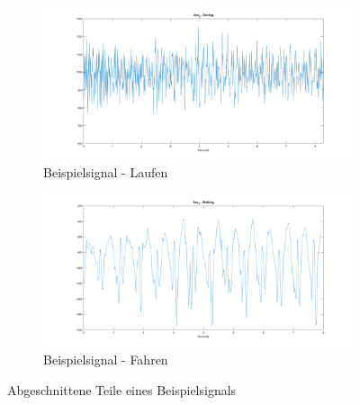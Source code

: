\begin{figure}[H]
	\centering
	\begin{subfigure}{\textwidth}
		\centering
		\includegraphics[width=\textwidth]{Bilder/AccZ_Driving_8Sec.png}
		\caption{Beispielsignal - Laufen}
		\label{fig:AccZ_Driving_8Sec}
	\end{subfigure}
	\hfill
	\begin{subfigure}{\textwidth}
		\centering
		\includegraphics[width=\textwidth]{Bilder/AccZ_Walking_8Sec.png}
		\caption{Beispielsignal - Fahren}
		\label{fig:AccZ_Walking_8Sec}
	\end{subfigure}
	\caption{Abgeschnittene Teile eines Beispielsignals}
	\label{fig:AbschnitteBeispielsignal}
\end{figure}



